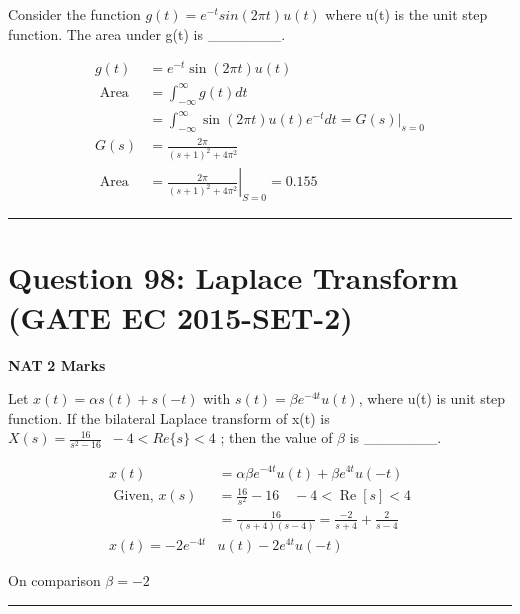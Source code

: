 \documentclass[11pt,a4paper]{article}
\begin{document}
\noindent Consider the function $g(t)=e^{-t}sin(2\pi t)u(t)$ where u(t) is the unit step function. The area under g(t) is \_\_\_\_\_\_\_.


\begin{tcolorbox}[solbox, title=Detailed Solution -- Question 97]
\[
\begin{aligned} g(t) &=e^{-t} \sin (2 \pi t) u(t) \\ \text { Area } &=\int_{-\infty}^{\infty} g(t) d t \\ &=\int_{-\infty}^{\infty} \sin (2 \pi t) u(t) e^{-t} d t=\left.G(s)\right|_{s=0} \\ G(s) &=\frac{2 \pi}{(s+1)^{2}+4 \pi^{2}} \\ \text { Area } &=\left.\frac{2 \pi}{(s+1)^{2}+4 \pi^{2}}\right|_{S=0}=0.155 \end{aligned}
\]
\end{tcolorbox}

\vspace{1.5em}
\hrule
\vspace{1.5em}

\section*{Question 98: Laplace Transform (GATE EC 2015-SET-2)}
\noindent \textbf{\color{primary}NAT} \hfill \textbf{\color{secondary}2 Marks}


\noindent Let $x(t)=\alpha s(t)+s(-t)$ with $s(t)=\beta e^{-4t}u(t)$, where u(t) is unit step function. If the bilateral Laplace transform of x(t) is 
 $X(s)=\frac{16}{s^{2}-16}    \; \; -4 < Re\lbrace s\rbrace < 4$ ; 
then the value of $\beta$ is \_\_\_\_\_\_\_.


\begin{tcolorbox}[solbox, title=Detailed Solution -- Question 98]
\[
\begin{aligned} x(t) &=\alpha \beta e^{-4 t} u(t)+\beta e^{4 t} u(-t) \\ \text { Given, } x(s) &=\frac{16}{s^{2}}-16 \quad-4 < \operatorname{Re}[s] < 4 \\ &=\frac{16}{(s+4)(s-4)}=\frac{-2}{s+4}+\frac{2}{s-4} \\ x(t)=-2 e^{-4 t} &u(t)-2 e^{4 t} u(-t) \end{aligned}
\]

 On comparison $\beta=-2$
\end{tcolorbox}

\vspace{1.5em}
\hrule
\vspace{1.5em}
\end{document}
